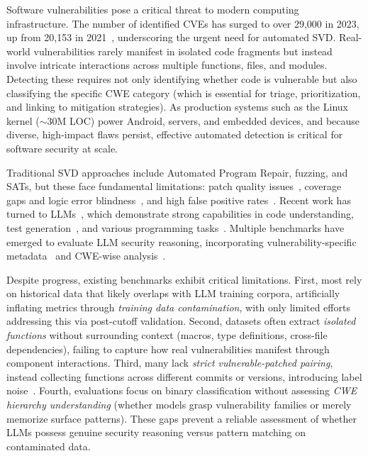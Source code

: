\documentclass[lettersize,journal]{IEEEtran}
\begin{document}
Software vulnerabilities pose a critical threat to modern computing infrastructure. The number of identified CVEs has surged to over 29,000 in 2023, up from 20,153 in 2021~\cite{cvedetails2024}, underscoring the urgent need for automated \gls{SVD}. Real-world vulnerabilities rarely manifest in isolated code fragments but instead involve intricate interactions across multiple functions, files, and modules. Detecting these requires not only identifying whether code is vulnerable but also classifying the specific \gls{CWE} category (which is essential for triage, prioritization, and linking to mitigation strategies). As production systems such as the Linux kernel ($\sim$30M LOC) power Android, servers, and embedded devices, and because diverse, high-impact flaws persist, effective automated detection is critical for software security at scale.

Traditional \gls{SVD} approaches include Automated Program Repair, fuzzing, and \glspl{SAT}, but these face fundamental limitations: patch quality issues~\cite{huang2023survey, zhang2023survey}, coverage gaps and logic error blindness~\cite{manes2019art, klees2018evaluating}, and high false positive rates~\cite{pereira2021machine}. Recent work has turned to \glspl{LLM}~\cite{chen2021evaluating, touvron2023llama, dubey2024llama, feng2020codebert, li2022competition}, which demonstrate strong capabilities in code understanding, test generation~\cite{alshahwan2024automated, wang2024software}, and various programming tasks~\cite{fan2023large}. Multiple benchmarks have emerged to evaluate \gls{LLM} security reasoning, incorporating vulnerability-specific metadata~\cite{siddiq2022securityeval, liu2024vuldetectbench, sun2024llm4vuln} and CWE-wise analysis~\cite{khare2025understanding, ullah2024llms}.

Despite progress, existing benchmarks exhibit critical limitations. First, most rely on historical data that likely overlaps with \gls{LLM} training corpora, artificially inflating metrics through \emph{training data contamination}, with only limited efforts~\cite{ullah2024llms} addressing this via post-cutoff validation. Second, datasets often extract \emph{isolated functions} without surrounding context (macros, type definitions, cross-file dependencies), failing to capture how real vulnerabilities manifest through component interactions. Third, many lack \emph{strict vulnerable-patched pairing}, instead collecting functions across different commits or versions, introducing label noise~\cite{gao2023far, iannone2022secret, croft2023data}. Fourth, evaluations focus on binary classification without assessing \emph{CWE hierarchy understanding} (whether models grasp vulnerability families or merely memorize surface patterns). These gaps prevent a reliable assessment of whether \glspl{LLM} possess genuine security reasoning versus pattern matching on contaminated data.
\end{document}
